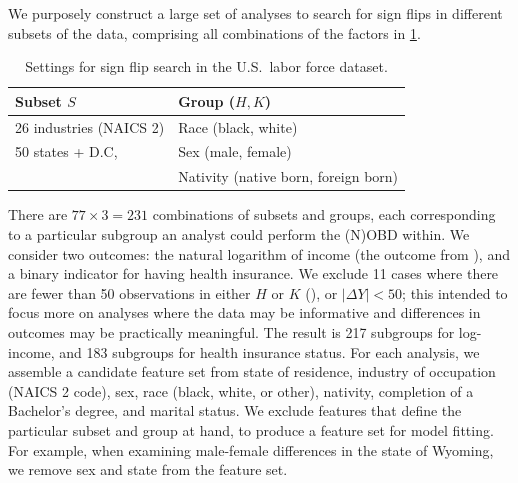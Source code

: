 We purposely construct a large set of analyses to search for sign flips in different subsets of the data, comprising all combinations of the factors in \cref{tab:us_census_design}.

\begin{table}[!ht]
    \caption{Settings for sign flip search in the U.S.\ labor force dataset.}
    \label{tab:us_census_design}
    \centering
    \footnotesize
    \setlength{\tabcolsep}{4pt}
    \begin{tabular}{@{}ll@{}}
    \toprule
    Subset \( S \) & Group (\( H, K \)) \\
    \midrule
    26 industries (NAICS 2) & Race (black, white)                  \\
    50 states + D.C,        & Sex (male, female)                   \\
                            & Nativity (native born, foreign born) \\
    \bottomrule
    \end{tabular}
\end{table}

There are \( 77 \times 3 = 231 \) combinations of subsets and groups, each corresponding to a particular subgroup an analyst could perform the (N)OBD within.
We consider two outcomes: the natural logarithm of income (the outcome from \citet{bach2024heterogeneity}), and a binary indicator for having health insurance.
We exclude 11 cases where there are fewer than 50 observations in either $H$ or $K$ (), or $|\Delta Y| < 50$; this intended to focus more on analyses where the data may be informative and differences in outcomes may be practically meaningful.
The result is 217 subgroups for log-income, and 183 subgroups for health insurance status.
For each analysis, we assemble a candidate feature set from state of residence, industry of occupation (NAICS 2 code), sex, race (black, white, or other), nativity, completion of a Bachelor's degree, and marital status.
We exclude features that define the particular subset and group at hand, to produce a feature set for model fitting.
For example, when examining male-female differences in the state of Wyoming, we remove sex and state from the feature set.

